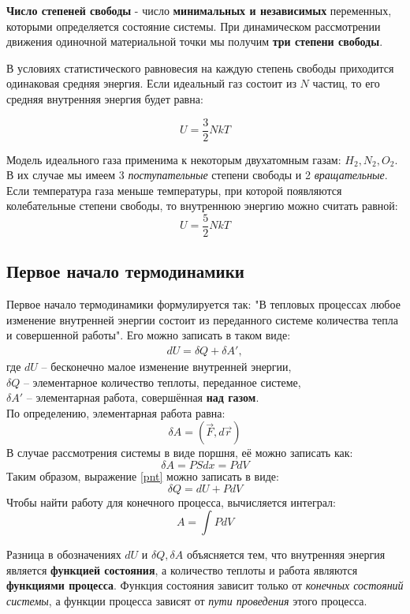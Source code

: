 \documentclass[a4paper,12pt]{article}
\begin{document}
\textbf{Число степеней свободы} - число \textbf{минимальных и независимых} переменных, которыми определяется состояние системы. При динамическом рассмотрении движения одиночной материальной точки мы получим \textbf{три степени свободы}.

В условиях статистического равновесия на каждую степень свободы приходится одинаковая средняя энергия. Если идеальный газ состоит из $N$ частиц, то его средняя внутренняя энергия будет равна:

\begin{equation}
U = \frac{3}{2}NkT
\end{equation}

Модель идеального газа применима к некоторым двухатомным газам: $H_2, N_2, O_2$. В их случае мы имеем 3 \textit{поступательные} степени свободы и 2 \textit{вращательные}. Если температура газа меньше температуры, при которой появляются колебательные степени свободы, то внутреннюю энергию можно считать равной:
\begin{equation}
U = \frac{5}{2}NkT
\end{equation}

\subsection{Первое начало термодинамики}
Первое начало термодинамики формулируется так: "В тепловых процессах любое изменение внутренней энергии состоит из переданного системе количества тепла и совершенной работы". Его можно записать в таком виде:
\begin{eqnarray}\label{pnt}
dU = \delta Q + \delta A',
\end{eqnarray}
где $dU$ -- бесконечно малое изменение внутренней энергии, \\$\delta Q$ -- элементарное количество теплоты, переданное системе,\\ $\delta A'$ -- элементарная работа, совершённая \textbf{над газом}.\\
По определению, элементарная работа равна:
$$\delta A = (\vec{F}, d\vec{r})$$
В случае рассмотрения системы в виде поршня, её можно записать как:
$$\delta A = PSdx = PdV$$
Таким образом, выражение \eqref{pnt} можно записать в виде:
\begin{equation}
\delta Q = dU + PdV
\end{equation}
Чтобы найти работу для конечного процесса, вычисляется интеграл:
$$A = \int PdV$$

Разница в обозначениях $dU$ и $\delta Q, \delta A$ объясняется тем, что внутренняя энергия является \textbf{функцией состояния}, а количество теплоты и работа являются \textbf{функциями процесса}. Функция состояния зависит только от \textit{конечных состояний системы}, а функции процесса зависят от \textit{пути проведения} этого процесса.
\end{document}
